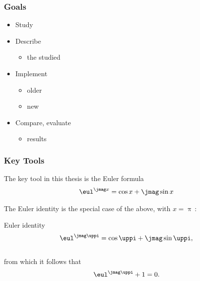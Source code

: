 \documentclass[%
  12pt,       				%
	t,                  %
	aspectratio=1610,   %
	unicode,						%
]{beamer}				    	%
\begin{document}
\disablenavigationsymbols

\maketitle

\begin{frame} 
	\frametitle{Goals}
	\begin{itemize}
			\item Study
			\item Describe
				\begin{itemize}
					\item the studied
				\end{itemize}
			\item Implement
				\begin{itemize}
					\item older
					\item new
				\end{itemize}
			\item Compare, evaluate
				\begin{itemize}
						\item results
				\end{itemize}
	\end{itemize}
\end{frame}

\begin{frame} 
	\frametitle{Key Tools}

	\begin{alertblock}{The key tool in this thesis is the Euler formula}
		$$\eul^{\jmag x}=\cos x + \jmag\sin x$$
	\end{alertblock}

	\vspace{4ex}
	The Euler identity is the special case of the above, with $x=\uppi$\,:

	\begin{block}{Euler identity}
		$$\eul^{\jmag \uppi}=\cos \uppi + \jmag\sin \uppi,$$\\
		from which it follows that
		$$\eul^{\jmag \uppi}+1=0.$$
	\end{block}
\end{frame} 
\end{document}
